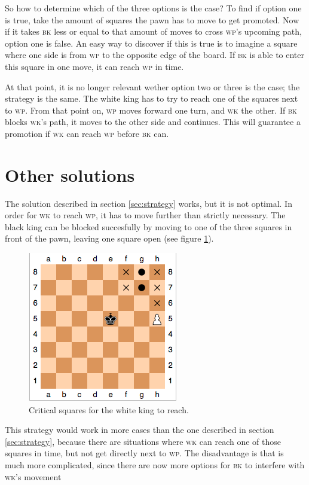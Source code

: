 \documentclass[titlepage,a4paper, 11pt]{article}
\newcommand{\bk}{\textsc{bk}\xspace}
\newcommand{\wk}{\textsc{wk}\xspace}
\renewcommand{\wp}{\textsc{wp}\xspace}
\begin{document}
So how to determine which of the three options is the case? To find if option one is true, take the amount
of squares the pawn has to move to get promoted. Now if it takes \bk less or equal to that amount of moves
to cross \wp's upcoming path, option one is false. An easy way to discover if this is true is to imagine
a square where one side is from \wp to the opposite edge of the board. If \bk is able to enter this square
in one move, it can reach \wp in time.

At that point, it is no longer relevant wether option two or three is the case; the strategy is the same.
The white king has to try to reach one of the squares next to \wp. From that point on, \wp moves forward
one turn, and \wk the other. If \bk blocks \wk's path, it moves to the other side and continues. This
will guarantee a promotion if \wk can reach \wp before \bk can.

\section{Other solutions}
\label{sec:other}
The solution described in section \ref{sec:strategy} works, but it is not optimal. In order for \wk to
reach \wp, it has to move further than strictly necessary. The black king can be blocked succesfully by
moving to one of the three squares in front of the pawn, leaving one square open (see figure 
\ref{fig:keysquares}). 
\begin{figure}[htb]
\centering
\includegraphics[scale = 0.65]{keysquares.png}
\caption{Critical squares for the white king to reach.}
\label{fig:keysquares}
\end{figure}
This strategy would work in more cases than the one described in section
\ref{sec:strategy}, because there are situations where \wk can reach one of those squares in time, but
not get directly next to \wp. The disadvantage is that is much more complicated, since there are now
more options for \bk to interfere with \wk's movement
\end{document}
